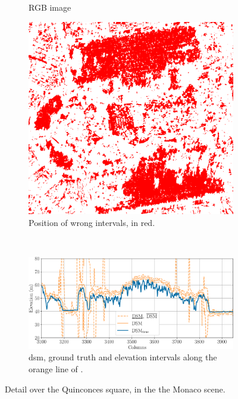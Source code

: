 \begin{figure}
\begin{subfigure}[t]{0.33\linewidth}
        \caption{RGB image}
        \label{fig:Bordeaux_RGB}
    \end{subfigure}\hfill
    \begin{subfigure}[t]{0.33\linewidth}
        \flushright
        \includegraphics[width=\linewidth]{Images/Chap_6/Bordeaux_error_zoom.png}
        \caption{Position of wrong intervals, in red.}
        \label{fig:Bordeaux_wrong_intervals}
    \end{subfigure}\\
    \begin{subfigure}[t]{\linewidth}
        \flushright
        \includegraphics[width=\linewidth]{Images/Chap_6/Bordeaux_row_600.png}
        \caption{\acrshort{dsm}, ground truth and elevation intervals along the orange line of .}
        \label{fig:Bordeaux_row}
    \end{subfigure}
    \caption{Detail over the Quinconces square, in the the Monaco scene.}
    \label{fig:Bordeaux_zoom}
\end{figure}


